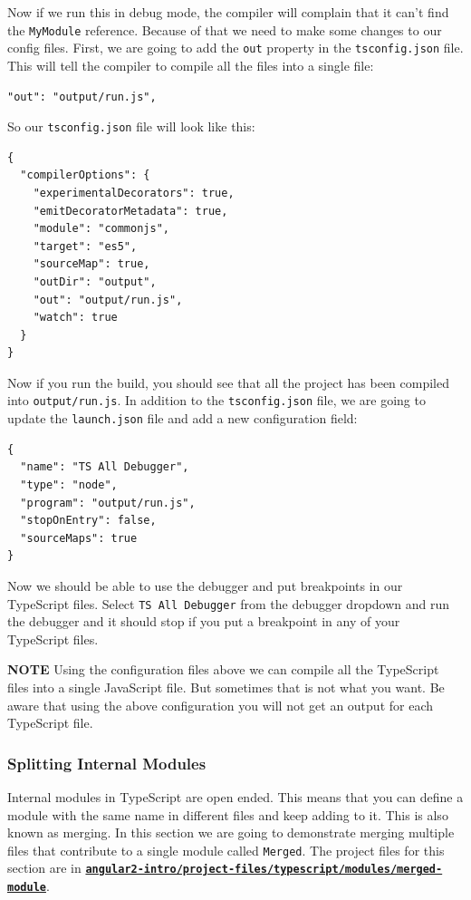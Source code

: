 \documentclass[12pt,]{article}
\begin{document}
Now if we run this in debug mode, the compiler will complain that it
can't find the \texttt{MyModule} reference. Because of that we need to
make some changes to our config files. First, we are going to add the
\texttt{out} property in the \texttt{tsconfig.json} file. This will tell
the compiler to compile all the files into a single file:

\begin{verbatim}
"out": "output/run.js",
\end{verbatim}

So our \texttt{tsconfig.json} file will look like this:

\begin{verbatim}
{
  "compilerOptions": {
    "experimentalDecorators": true,
    "emitDecoratorMetadata": true,
    "module": "commonjs",
    "target": "es5",
    "sourceMap": true,
    "outDir": "output",
    "out": "output/run.js",
    "watch": true
  }
}
\end{verbatim}

Now if you run the build, you should see that all the project has been
compiled into \texttt{output/run.js}. In addition to the
\texttt{tsconfig.json} file, we are going to update the
\texttt{launch.json} file and add a new configuration field:

\begin{verbatim}
{
  "name": "TS All Debugger",
  "type": "node",
  "program": "output/run.js",
  "stopOnEntry": false,
  "sourceMaps": true
}
\end{verbatim}

Now we should be able to use the debugger and put breakpoints in our
TypeScript files. Select \texttt{TS\ All\ Debugger} from the debugger
dropdown and run the debugger and it should stop if you put a breakpoint
in any of your TypeScript files.

\textbf{NOTE} Using the configuration files above we can compile all the
TypeScript files into a single JavaScript file. But sometimes that is
not what you want. Be aware that using the above configuration you will
not get an output for each TypeScript file.

\subsubsection{Splitting Internal
Modules}\label{splitting-internal-modules}

Internal modules in TypeScript are open ended. This means that you can
define a module with the same name in different files and keep adding to
it. This is also known as merging. In this section we are going to
demonstrate merging multiple files that contribute to a single module
called \texttt{Merged}. The project files for this section are in
\href{https://github.com/aminmeyghani/angular2-intro/tree/master/project-files/typescript/modules/merged-module}{\textbf{\texttt{angular2-intro/project-files/typescript/modules/merged-module}}}.
\end{document}
